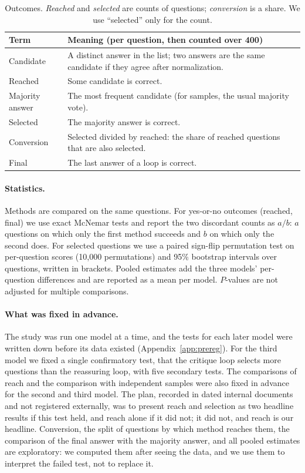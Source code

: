 \documentclass[11pt]{article}
\begin{document}
\begin{table}[t]
\centering
\small
\setlength{\tabcolsep}{3pt}
\begin{tabular}{@{}lp{5.6cm}@{}}
\toprule
Term & Meaning (per question, then counted over 400) \\
\midrule
Candidate & A distinct answer in the list; two answers are the same candidate if they agree after normalization. \\
Reached & Some candidate is correct. \\
Majority answer & The most frequent candidate (for samples, the usual majority vote). \\
Selected & The majority answer is correct. \\
Conversion & Selected divided by reached: the share of reached questions that are also selected. \\
Final & The last answer of a loop is correct. \\
\bottomrule
\end{tabular}
\caption{Outcomes. \emph{Reached} and \emph{selected} are counts of questions; \emph{conversion} is a share. We use ``selected'' only for the count.}
\label{tab:terms}
\end{table}

\paragraph{Statistics.}
Methods are compared on the same questions.
For yes-or-no outcomes (reached, final) we use exact McNemar tests and report the two discordant counts as $a/b$: $a$ questions on which only the first method succeeds and $b$ on which only the second does.
For selected questions we use a paired sign-flip permutation test on per-question scores (10{,}000 permutations) and 95\% bootstrap intervals over questions, written in brackets.
Pooled estimates add the three models' per-question differences and are reported as a mean per model.
$P$-values are not adjusted for multiple comparisons.

\paragraph{What was fixed in advance.}
The study was run one model at a time, and the tests for each later model were written down before its data existed (Appendix~\ref{app:prereg}).
For the third model we fixed a single confirmatory test, that the critique loop selects more questions than the reassuring loop, with five secondary tests.
The comparisons of reach and the comparison with independent samples were also fixed in advance for the second and third model.
The plan, recorded in dated internal documents and not registered externally, was to present reach and selection as two headline results if this test held, and reach alone if it did not; it did not, and reach is our headline.
Conversion, the split of questions by which method reaches them, the comparison of the final answer with the majority answer, and all pooled estimates are exploratory: we computed them after seeing the data, and we use them to interpret the failed test, not to replace it.
\end{document}
